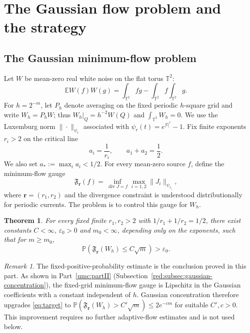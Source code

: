 \documentclass[11pt]{article}
\newtheorem{theorem}{Theorem}[section]
\theoremstyle{definition}
\theoremstyle{remark}
\newtheorem{remark}[remark]{Remark}
\numberwithin{equation}{section}
\newcommand{\T}{\mathbb T}
\newcommand{\E}{\mathbb E}
\newcommand{\Pp}{\mathbb P}
\newcommand{\divv}{\operatorname{div}}
\begin{document}
\section{The Gaussian flow problem and the strategy}\label{sec:introduction}

\subsection{The Gaussian minimum-flow problem}

Let $W$ be mean-zero real white noise on the flat torus $\T^2$:
\begin{equation}\label{eq:white}
 \E W(f)W(g)=\int_{\T^2}fg-\int_{\T^2}f\int_{\T^2}g.
\end{equation}
\label{not:fixedgrid}
For $h=2^{-m}$, let $P_h$ denote averaging on the fixed periodic
$h$-square grid and write $W_h=P_hW$; thus
$W_h|_Q=h^{-2}W(Q)$ and $\int_{\T^2}W_h=0$.
\label{not:orlicz}
We use the Luxemburg norm $\|\cdot\|_{\psi_r}$ associated with
$\psi_r(t)=e^{|t|^r}-1$. Fix finite exponents $r_i>2$ on the
critical line
\begin{equation}\label{eq:crit}
 a_i=\frac1{r_i},\qquad a_1+a_2=\frac12.
\end{equation}
\label{not:astar}
We also set $a_*:=\max_i a_i<1/2$. For every mean-zero source
$f$, define the minimum-flow gauge
\begin{equation}\label{eq:gauge}
 \mathfrak F_{\boldsymbol r}(f)
 =\inf_{\divv J=f}\max_{i=1,2}\|J_i\|_{\psi_{r_i}},
\end{equation}
where $\boldsymbol r=(r_1,r_2)$ and the divergence constraint is
understood distributionally for periodic currents. The problem is
to control this gauge for $W_h$.

\begin{theorem}\label{thm:gauss}
For every fixed finite $r_1,r_2>2$ with
$1/r_1+1/r_2=1/2$, there exist constants $C<\infty$, $\varepsilon_0>0$ and
$m_0<\infty$, depending only on the exponents, such that for
$m\ge m_0$,
\begin{equation}\label{eq:target}
 \Pp\left(\mathfrak F_{\boldsymbol r}(W_h)\le C\sqrt m\right)
 >\varepsilon_0.
\end{equation}
\end{theorem}

\begin{remark}\label{rem:concentration-upgrade}
The fixed-positive-probability estimate is the conclusion proved
in this part. As shown in Part~\ref{umc:partII}
(Subsection~\ref{red:subsec:gaussian-concentration}),
the fixed-grid minimum-flow gauge is Lipschitz in the Gaussian
coefficients with a constant independent of $h$. Gaussian
concentration therefore upgrades \eqref{eq:target} to
$\Pp(\mathfrak F_{\boldsymbol r}(W_h)>C'\sqrt m)
\le 2e^{-cm}$ for suitable $C',c>0$. This improvement requires
no further adaptive-flow estimates and is not used below.
\end{remark}
\end{document}
